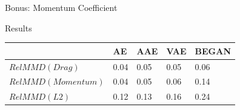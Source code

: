 \documentclass{beamer}
\begin{document}
\begin{frame}{Bonus: Momentum Coefficient}
\end{frame}
\begin{frame}{Results}
\begin{table}[H]
\begin{tabular}{|l|l|l|l|l|}
\hline
&   AE & AAE &  VAE &  BEGAN  \\ \hline
$RelMMD(Drag)$ & 0.04 & 0.05 &  0.05 &  0.06 \\ \hline
$RelMMD(Momentum)$  &  0.04 &  0.05 & 0.06 &  0.14  \\ \hline
$RelMMD(L2)$ & 0.12 & 0.13 &  0.16	 &  0.24 \\ \hline
\end{tabular}
\end{table}
\end{frame}
\end{document}
